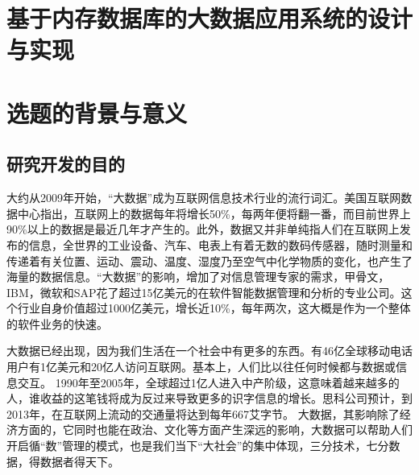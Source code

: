 \documentclass[proposal]{zjutreport}
\begin{document}



\frontmatter

\begingroup %
\let\clearpage\relax %

\titleformat{\chapter}[block]{\sihao\heiti\filcenter\bfseries}{\CJKnumber{\thechapter}}{1ex}{}{} %
\chapter*{基于内存数据库的大数据应用系统的设计与实现}
{} %

\mainmatter
\chapter{选题的背景与意义}
\section{研究开发的目的}
大约从2009年开始，“大数据”成为互联网信息技术行业的流行词汇。美国互联网数据中心指出，互联网上的数据每年将增长50\%，每两年便将翻一番，而目前世界上90\%以上的数据是最近几年才产生的。此外，数据又并非单纯指人们在互联网上发布的信息，全世界的工业设备、汽车、电表上有着无数的数码传感器，随时测量和传递着有关位置、运动、震动、温度、湿度乃至空气中化学物质的变化，也产生了海量的数据信息。“大数据”的影响，增加了对信息管理专家的需求，甲骨文，IBM，微软和SAP花了超过15亿美元的在软件智能数据管理和分析的专业公司。这个行业自身价值超过1000亿美元，增长近10\%，每年两次，这大概是作为一个整体的软件业务的快速。

大数据已经出现，因为我们生活在一个社会中有更多的东西。有46亿全球移动电话用户有1亿美元和20亿人访问互联网。基本上，人们比以往任何时候都与数据或信息交互。 1990年至2005年，全球超过1亿人进入中产阶级，这意味着越来越多的人，谁收益的这笔钱将成为反过来导致更多的识字信息的增长。思科公司预计，到2013年，在互联网上流动的交通量将达到每年667艾字节。
大数据，其影响除了经济方面的，它同时也能在政治、文化等方面产生深远的影响，大数据可以帮助人们开启循“数”管理的模式，也是我们当下“大社会”的集中体现，三分技术，七分数据，得数据者得天下。
\end{document}
